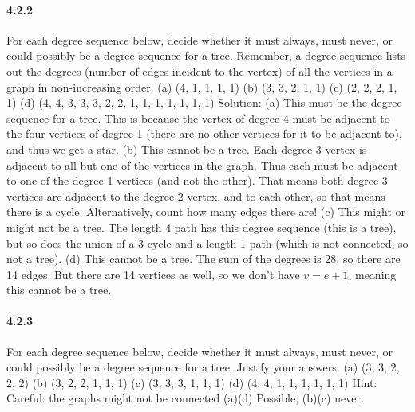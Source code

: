 \documentclass{article}
\begin{document}
\paragraph{4.2.2}
For each degree sequence below, decide whether it must always, must never, or could possibly be a degree sequence for a tree. Remember, a degree sequence lists out the degrees (number of edges incident to the vertex) of all the vertices in a graph in non-increasing order.\newline
(a) (4, 1, 1, 1, 1)\newline
(b) (3, 3, 2, 1, 1)\newline
(c) (2, 2, 2, 1, 1)\newline
(d) (4, 4, 3, 3, 3, 2, 2, 1, 1, 1, 1, 1, 1, 1)\newline
Solution:\newline
(a) This must be the degree sequence for a tree. This is because the
vertex of degree 4 must be adjacent to the four vertices of degree 1
(there are no other vertices for it to be adjacent to), and thus we get a
star.\newline
(b) This cannot be a tree. Each degree 3 vertex is adjacent to all but one
of the vertices in the graph. Thus each must be adjacent to one of
the degree 1 vertices (and not the other). That means both degree 3
vertices are adjacent to the degree 2 vertex, and to each other, so that
means there is a cycle.
Alternatively, count how many edges there are!\newline
(c) This might or might not be a tree. The length 4 path has this degree
sequence (this is a tree), but so does the union of a 3-cycle and a
length 1 path (which is not connected, so not a tree).\newline
(d) This cannot be a tree. The sum of the degrees is 28, so there are 14
edges. But there are 14 vertices as well, so we don’t have $v = e + 1$,
meaning this cannot be a tree.
\paragraph{4.2.3}
For each degree sequence below, decide whether it must always, must never, or could possibly be a degree sequence for a tree. Justify your answers.\newline
(a) (3, 3, 2, 2, 2)\newline
(b) (3, 2, 2, 1, 1, 1)\newline
(c) (3, 3, 3, 1, 1, 1)\newline
(d) (4, 4, 1, 1, 1, 1, 1, 1)\newline
Hint:\newline
Careful: the graphs might not be connected\newline
(a)(d) Possible, (b)(c) never.
\end{document}
